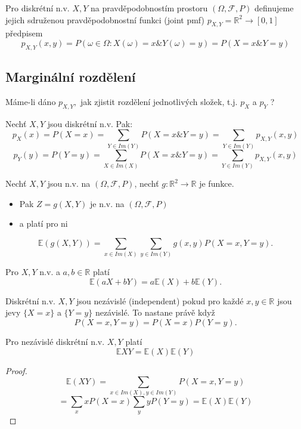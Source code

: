 \documentclass[../main.tex]{subfiles}
\begin{document}
\begin{definition}
    Pro diskrétní n.v. $X,Y$ na pravděpodobnostím prostoru $(\Omega, \mathcal{F},P)$ definujeme jejich sdruženou pravděpodobnostní funkci
    (joint pmf) $p_{X,Y} = \mathbb{R}^2 \rightarrow [0,1]$ předpisem
    \[p_{X,Y} (x,y) = P({\omega \in \Omega : X(\omega) = x\& Y(\omega) = y}) = P(X = x \& Y = y)\]
\end{definition}

\subsection{Marginální rozdělení}

Máme-li dáno $p_{X,Y},$ jak zjistit rozdělení jednotlivých složek, t.j. $p_X$ a $p_Y$ ?

\begin{theorem}
    Nechť $X,Y$ jsou diskrétní n.v. Pak:
    \[p_X(x) = P(X=x) = \sum_{Y\in Im(Y)} P(X = x \& Y=y) = \sum_{Y\in Im(Y)} p_{X,Y}(x,y)\]
    \[p_Y(y) = P(Y=y) = \sum_{X\in Im(X)} P(X = x \& Y=y) = \sum_{Y\in Im(Y)} p_{X,Y}(x,y)\]
\end{theorem}
\begin{theorem}
    Nechť $X,Y$ jsou n.v. na $(\Omega, \mathcal{F},P)$, nechť $g: \mathbb{R}^2 \rightarrow \mathbb{R}$ je funkce.
    \begin{itemize}
        \item Pak $Z = g(X,Y)$ je n.v. na $(\Omega, \mathcal{F},P)$
        \item a platí pro ni 
    \end{itemize}
    \[\mathbb{E}(g(X,Y)) = \sum_{x\in Im(X)} \sum_{y\in Im(Y)} g(x,y)P(X=x,Y=y).\]
\end{theorem}
\begin{theorem}
    Pro $X,Y$ n.v. a $a,b \in \mathbb{R}$ platí
    \[\mathbb{E}(aX + bY) = a\mathbb{E}(X) + b\mathbb{E}(Y).\]
\end{theorem}
\begin{definition}
    Diskrétní n.v. $X,Y$ jsou nezávislé (independent) pokud pro každé $x,y \in \mathbb{R}$ jsou jevy 
    $\{X=x\}$ a $\{Y=y\}$ nezávislé. To nastane právě když
    \[P(X=x,Y=y) = P(X=x)P(Y=y).\]
\end{definition}

\begin{theorem}
    Pro nezávislé diskrétní n.v. $X,Y$ platí
    \[\mathbb{E}XY = \mathbb{E}(X)\mathbb{E}(Y)\]
\end{theorem}
\begin{proof}
    \[\mathbb{E}(XY) = \sum_{x\in Im(X), y \in Im(Y)} P(X=x, Y=y)\]
    \[= \sum_x x P(X=x) \sum_y yP(Y=y) = \mathbb{E}(X)\mathbb{E}(Y)\]
\end{proof}
\end{document}
